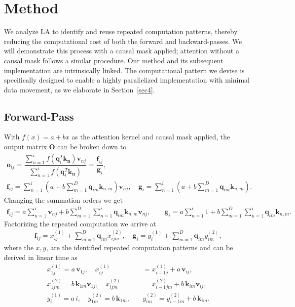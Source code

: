 \section{Method}
\label{sec3}
We analyze LA to identify and reuse repeated computation patterns, thereby reducing the computational cost of both the forward and backward-passes. We will demonstrate this process with a causal mask applied; attention without a causal mask follows a similar procedure. Our method and its subsequent implementation are intrinsically linked. The computational pattern we devise is specifically designed to enable a highly parallelized implementation with minimal data movement, as we elaborate in Section~\ref{sec4}.

\subsection{Forward-Pass}
With $f(x) = a + bx$ as the attention kernel and causal mask applied, the output matrix $\mathbf{O}$ can be broken down to 
\begin{gather}
\mathbf{o}_{ij} = \dfrac{\sum_{n=1}^{i}{f(\mathbf{q}_i^T\mathbf{k_n} )\mathbf{v}_{nj}}}{\sum_{n=1}^{i}{f(\mathbf{q}_i^T\mathbf{k_n} )}} = \dfrac{\mathbf{f}_{ij}}{\mathbf{g}_i},\label{div}\\
\mathbf{f}_{ij} \!= \!\sum_{n=1}^{i}\!\left(a + b\!\sum_{m=1}^{D} \!{\mathbf{q}_{im}\mathbf{k}_{n,m}}\right)\mathbf{v}_{nj},\quad
 \mathbf{g}_{i} \!= \!\sum_{n=1}^{i}\left(a + b\sum_{m=1}^{D}\!{\mathbf{q}_{im}\mathbf{k}_{n,m}}\right).\label{fijgi}
\end{gather}
Changing the summation orders we get
\begin{align}
    \mathbf{f}_{ij} = a\sum_{n=1}^{i}{\mathbf{v}_{nj}} + b\sum_{m=1}^{D}{\sum_{n=1}^{i}{\mathbf{q}_{im}\mathbf{k}_{n,m}\mathbf{v}_{nj}}},\quad\quad
    \mathbf{g}_{i} = a\sum_{n=1}^{i}{1} + b\sum_{m=1}^{D}{\sum_{n=1}^{i}{\mathbf{q}_{im}\mathbf{k}_{n,m}}}.\label{fg}
\end{align}
Factorizing the repeated computation we arrive at
\begin{align}
    \mathbf{f}_{ij} = x^{(1)}_{ij} + \sum_{m=1}^{D}{\mathbf{q}_{im}x^{(2)}_{ijm}},\quad
    \mathbf{g}_{i} = y^{(1)}_i + \sum_{m=1}^{D}{\mathbf{q}_{im}y^{(2)}_{im}},\label{fglast}
\end{align}
where the $x, y$, are the identified repeated computation patterns and can be derived in linear time as
\begin{align}
    x^{(1)}_{1j} = a\,\mathbf{v}_{1j},\quad x^{(1)}_{ij}& = x^{(1)}_{i-1j} + a\,\mathbf{v}_{ij},\nonumber\\
    x^{(2)}_{1jm} =b\,\mathbf{k}_{1m}\mathbf{v}_{1j},\quad x^{(2)}_{ijm}& = x^{(2)}_{i-1jm} + b\,\mathbf{k}_{im}\mathbf{v}_{ij},\nonumber\\
    y^{(1)}_i = a\,i, \quad y^{(2)}_{1m} = b\,\mathbf{k}_{1m}, \quad &y^{(2)}_{im} = y^{(2)}_{i-1m} + b\,\mathbf{k}_{im}.\label{xy}
\end{align}
